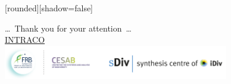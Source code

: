 
{
  [rounded][shadow=false]
  \begin{frame}
    \begin{block}{}
      \begin{center}
        \ldots~Thank you for your attention~\ldots \\
        \href{https://www.fondationbiodiversite.fr/en/the-frb-in-action/programs-and-projects/le-cesab/intraco/}{INTRACO}\\
        \includegraphics[height=1.5cm]{figs/logos-FRB-Cesab-iDiv-sDiv}
      \end{center}
    \end{block}
  \end{frame}
}

